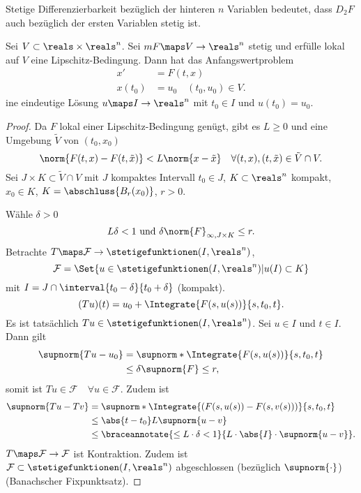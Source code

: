 \begin{bemerkung*}
  Stetige Differenzierbarkeit bezüglich der hinteren \( n \) Variablen bedeutet, dass \( D_2 F \) auch bezüglich der ersten Variablen stetig ist.
\end{bemerkung*}
\begin{satz}\label{picard-lindeloef}
  Sei \( V\subset \reals\times \reals^n  \). Sei \( mF\maps V\to \reals^n \) stetig und erfülle lokal auf \( V \) eine Lipschitz-Bedingung. Dann hat das Anfangswertproblem
  \begin{align*}
    x'&=F(t,x)\\
    x(t_0)&=u_0\quad (t_0,u_0)\in V.
  \end{align*}
  ine eindeutige Lösung \( u\maps I\to \reals^n \) mit \( t_0\in I \) und \( u(t_0)=u_0 \).
\end{satz}
\begin{proof}
  Da \( F \) lokal einer Lipschitz-Bedingung genügt, gibt es \( L\geq 0 \) und eine Umgebung \( \tilde{V} \) von \( (t_0,x_0) \) \sd
  \begin{equation*}
    \norm{F(t,x)-F(t,\tilde{x})}< L\norm{x-\tilde{x}}\quad \forall (t,x),(t,\tilde{x})\in \tilde{V}\cap V.
  \end{equation*}
  Sei \( J\times K\subset \tilde{V}\cap V \) mit \( J \) kompaktes Intervall \( t_0\in J \), \( K\subset \reals^n \) kompakt, \( x_0\in K \), \obda \( K=\abschluss{B_r(x_0)} \), \( r>0 \). 
  
  Wähle \( \delta>0 \) \sd
  \begin{equation*}
    L\delta<1 \text{ und }\delta\norm{F}_{\infty, J\times K}\leq r.
  \end{equation*}
  Betrachte \( T\maps \mathcal{F}\to \stetigefunktionen(I,\reals^n) \),
  \begin{equation*}
    \mathcal{F}=\Set{u\in \stetigefunktionen(I,\reals^n)|u(I)\subset K}
  \end{equation*}
  mit \( I=J\cap \interval{t_0-\delta}{t_0+\delta} \) (kompakt).
  \begin{equation*}
    (Tu)(t)=u_0+\Integrate{F(s,u(s))}{s,t_0,t}.
  \end{equation*}
  Es ist tatsächlich \( Tu\in \stetigefunktionen(I,\reals^n) \). Sei \( u\in I \) und \( t\in I \). Dann gilt
  \begin{align*}
    \supnorm{Tu-u_0}&=\supnorm*{\Integrate{F(s,u(s))}{s,t_0,t}}\\
    &\leq \delta\supnorm{F}\leq r,
  \end{align*}
  somit ist \( Tu\in \mathcal{F}\quad \forall u\in \mathcal{F} \). Zudem ist 
  \begin{align*}
    \supnorm{Tu-Tv}&=\supnorm*{\Integrate{(F(s,u(s))-F(s,v(s)))}{s,t_0,t}}\\
    &\leq\abs{t-t_0}L\supnorm{u-v}\\
    &\leq \braceannotate{\leq L\cdot \delta<1}{L\cdot \abs{I}\cdot\supnorm{u-v}}.
  \end{align*}
  \timplies \( T\maps \mathcal{F}\to \mathcal{F} \) ist Kontraktion. Zudem ist \( \mathcal{F}\subset \stetigefunktionen(I,\reals^n) \)   abgeschlossen (bezüglich \( \supnorm{\cdot} \)) \timplies \Beh (Banachscher Fixpunktsatz).

  
\end{proof}
